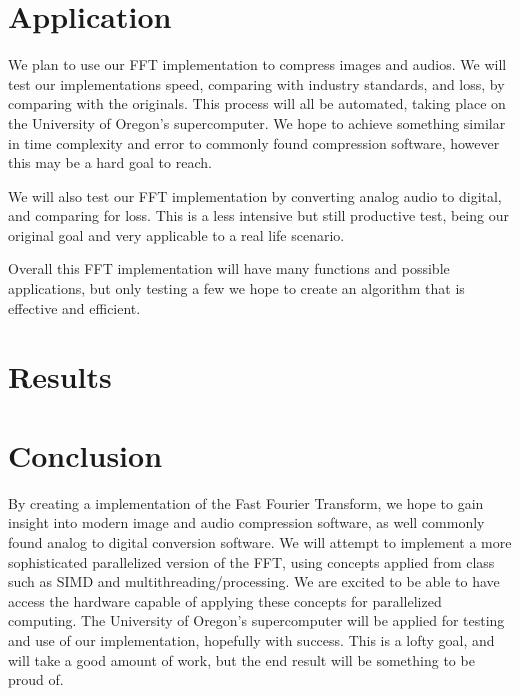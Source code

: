 \documentclass[12pt]{extarticle}
\begin{document}
\section*{Application}
	We plan to use our FFT implementation to compress images and audios. 
	We will test our implementations speed, comparing with industry standards, and loss, by comparing with the originals. 
	This process will all be automated, taking place on the University of Oregon's supercomputer. 
	We hope to achieve something similar in time complexity and error to commonly found compression software, however this may be a hard goal to reach. 
	
	We will also test our FFT implementation by converting analog audio to digital, and comparing for loss. 
	This is a less intensive but still productive test, being our original goal and very applicable to a real life scenario. 
	
	Overall this FFT implementation will have many functions and possible applications, but only testing a few we hope to create an algorithm that is effective and efficient.
\section{Results}
\section*{Conclusion}
	By creating a implementation of the Fast Fourier Transform, we hope to gain insight into modern image and audio compression software, as well commonly found analog to digital conversion software.
    We will attempt to implement a more sophisticated parallelized version of the FFT, using concepts applied from class such as SIMD and multithreading/processing.
    We are excited to be able to have access the hardware capable of applying these concepts for parallelized computing.
	The University of Oregon's supercomputer will be applied for testing and use of our implementation, hopefully with success. 
	This is a lofty goal, and will take a good amount of work, but the end result will be something to be proud of.


\end{document}
